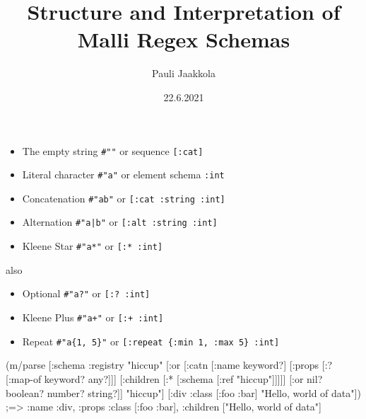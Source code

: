 \documentclass{beamer}
\title{Structure and Interpretation of Malli Regex Schemas}
\author{Pauli Jaakkola}
\date{22.6.2021}
\begin{document}
\frame{\titlepage}


\begin{frame}

\begin{itemize}
\item The empty string \texttt{\#""} or sequence \texttt{[:cat]}
\item Literal character \texttt{\#"a"} or element schema \texttt{:int}
\item Concatenation \texttt{\#"ab"} or \texttt{[:cat :string :int]}
\item Alternation \texttt{\#"a|b"} or \texttt{[:alt :string :int]}
\item Kleene Star \texttt{\#"a*"} or \texttt{[:* :int]}
\end{itemize}

also

\begin{itemize}
\item Optional \texttt{\#"a?"} or \texttt{[:? :int]}
\item Kleene Plus \texttt{\#"a+"} or \texttt{[:+ :int]}
\item Repeat \texttt{\#"a\{1, 5\}"} or \texttt{[:repeat \{:min 1, :max 5\} :int]}
\end{itemize}

\end{frame}


\begin{frame}[fragile]

{\scriptsize
\begin{semiverbatim}
(m/parse
  [:schema {:registry {"hiccup" [:or
                                 [:catn
                                  [:name keyword?]
                                  [:props [:? [:map-of keyword? any?]]]
                                  [:children [:* [:schema [:ref "hiccup"]]]]]
                                 [:or nil? boolean? number? string?]]}}
   "hiccup"]
  [:div {:class [:foo :bar]}
   "Hello, world of data"])
;=> {:name :div, :props {:class [:foo :bar]}, :children ["Hello, world of data"]}
\end{semiverbatim}
}

\end{frame}

\end{document}
